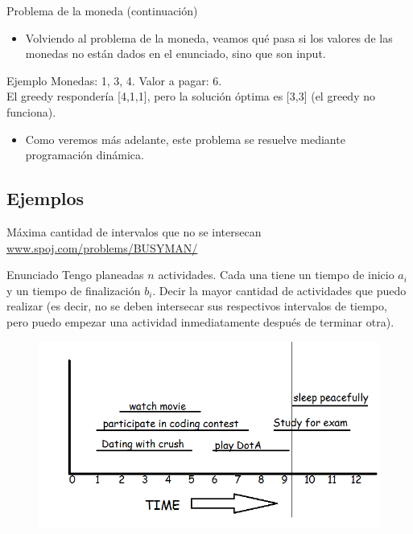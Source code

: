 \documentclass{beamer}
\begin{document}
\begin{frame}{Problema de la moneda (continuaci\'on)}
\begin{itemize}
\item
Volviendo al problema de la moneda, veamos qu\'e pasa si los valores de las monedas no est\'an dados en el enunciado, sino que son input.
\end{itemize}
\begin{block}{Ejemplo}
Monedas: 1, 3, 4. Valor a pagar: 6.\\
El greedy responder\'ia [4,1,1], pero la soluci\'on \'optima es [3,3] (el greedy no funciona).
\end{block}
\begin{itemize}
\item
Como veremos m\'as adelante, este problema se resuelve mediante programaci\'on din\'amica.
\end{itemize}
\end{frame}
\subsection{Ejemplos}
\begin{frame}{M\'axima cantidad de intervalos que no se intersecan}
\url{www.spoj.com/problems/BUSYMAN/}
\begin{block}{Enunciado}
Tengo planeadas $n$ actividades. Cada una tiene un tiempo de inicio $a_i$ y un tiempo de finalizaci\'on $b_i$. Decir la mayor cantidad de actividades que puedo realizar (es decir, no se deben intersecar sus respectivos intervalos de tiempo, pero puedo empezar una actividad inmediatamente despu\'es de terminar otra).
\end{block}
\begin{figure}
\includegraphics[width=0.6 \textwidth]{busyman}
\end{figure}

\end{frame}
\end{document}
